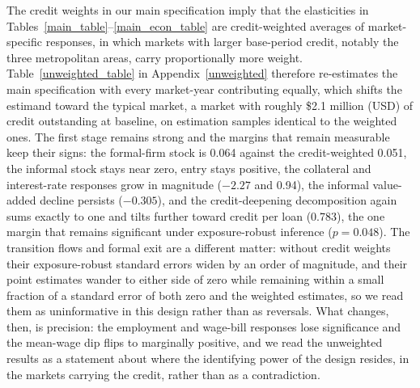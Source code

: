 \documentclass[12pt]{article}
\begin{document}
The credit weights in our main specification imply that the elasticities in Tables~\ref{main_table}--\ref{main_econ_table} are credit-weighted averages of market-specific responses, in which markets with larger base-period credit, notably the three metropolitan areas, carry proportionally more weight. Table~\ref{unweighted_table} in Appendix~\ref{unweighted} therefore re-estimates the main specification with every market-year contributing equally, which shifts the estimand toward the typical market, a market with roughly \$2.1 million (USD) of credit outstanding at baseline, on estimation samples identical to the weighted ones. The first stage remains strong and the margins that remain measurable keep their signs: the formal-firm stock is 0.064 against the credit-weighted 0.051, the informal stock stays near zero, entry stays positive, the collateral and interest-rate responses grow in magnitude ($-2.27$ and 0.94), the informal value-added decline persists ($-0.305$), and the credit-deepening decomposition again sums exactly to one and tilts further toward credit per loan (0.783), the one margin that remains significant under exposure-robust inference ($p = 0.048$). The transition flows and formal exit are a different matter: without credit weights their exposure-robust standard errors widen by an order of magnitude, and their point estimates wander to either side of zero while remaining within a small fraction of a standard error of both zero and the weighted estimates, so we read them as uninformative in this design rather than as reversals. What changes, then, is precision: the employment and wage-bill responses lose significance and the mean-wage dip flips to marginally positive, and we read the unweighted results as a statement about where the identifying power of the design resides, in the markets carrying the credit, rather than as a contradiction.
\end{document}
